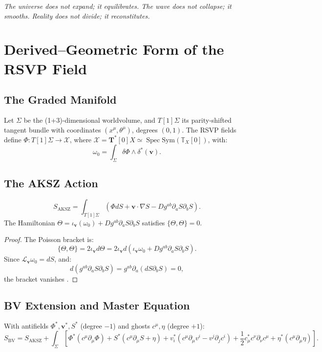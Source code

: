 \documentclass[12pt]{article}
\begin{document}
\begin{center}
\emph{The universe does not expand; it equilibrates. The wave does not collapse; it smooths. Reality does not divide; it reconstitutes.}
\end{center}

\appendix
\section{Derived–Geometric Form of the RSVP Field}
\label{app:derived}

\subsection{The Graded Manifold}

Let \(\Sigma\) be the (1+3)-dimensional worldvolume, and \(T[1]\Sigma\) its parity-shifted tangent bundle with coordinates \((x^\mu, \theta^\mu)\), degrees \((0,1)\). The RSVP fields define \(\Phi: T[1]\Sigma \to \mathcal{X}\), where \(\mathcal{X} = \mathbf{T}^*[0]X \simeq \operatorname{Spec} \mathrm{Sym}(\mathbb{T}_X[0])\), with:
\[
\omega_0 = \int_\Sigma \delta \Phi \wedge \delta^* (\mathbf{v}).
\]

\subsection{The AKSZ Action}

\[
S_{\mathrm{AKSZ}} = \int_{T[1]\Sigma} \left( \Phi dS + \mathbf{v} \cdot \nabla S - D g^{ab} \partial_a S \partial_b S \right).
\]
The Hamiltonian \(\Theta = \iota_{\mathbf{v}}(\omega_0) + D g^{ab} \partial_a S \partial_b S\) satisfies \(\{\Theta, \Theta\} = 0\).

\begin{proof}
The Poisson bracket is:
\[
\{\Theta, \Theta\} = 2 \iota_{\mathbf{v}} d\Theta = 2 \iota_{\mathbf{v}} d \left( \iota_{\mathbf{v}} \omega_0 + D g^{ab} \partial_a S \partial_b S \right).
\]
Since \(\mathcal{L}_{\mathbf{v}} \omega_0 = dS\), and:
\[
d (g^{ab} \partial_a S \partial_b S) = g^{ab} \partial_a (d S \partial_b S) = 0,
\]
the bracket vanishes \citep{Alexandrov1997}.
\end{proof}

\subsection{BV Extension and Master Equation}

With antifields \(\Phi^*, \mathbf{v}^*, S^*\) (degree \(-1\)) and ghosts \(c^\mu, \eta\) (degree \(+1\)):
\[
S_{\mathrm{BV}} = S_{\mathrm{AKSZ}} + \int_\Sigma \left[ \Phi^* (c^\mu \partial_\mu \Phi) + S^* (c^\mu \partial_\mu S + \eta) + v_i^* (c^\mu \partial_\mu v^i - v^j \partial_j c^i) + \frac{1}{2} c_\mu^* c^\nu \partial_\nu c^\mu + \eta^* (c^\mu \partial_\mu \eta) \right].
\]
\end{document}
